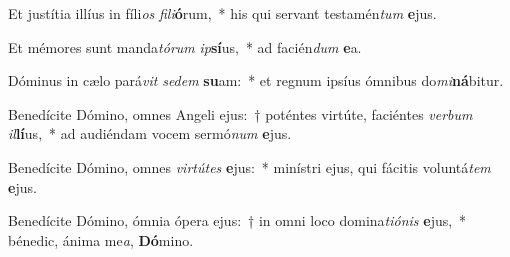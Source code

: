 \item Et justítia illíus in fíli\textit{os} \textit{fi}\textit{li}\textbf{ó}rum,~* his qui servant testamén\textit{tum} \textbf{e}jus.
\item Et mémores sunt manda\textit{tó}\textit{rum} \textit{ip}\textbf{sí}us,~* ad facién\textit{dum} \textbf{e}a.
\item Dóminus in cælo pará\textit{vit} \textit{se}\textit{dem} \textbf{su}am:~* et regnum ipsíus ómnibus do\textit{mi}\textbf{ná}bitur.
\item Benedícite Dómino, omnes Angeli ejus:~† poténtes virtúte, faciéntes \textit{ver}\textit{bum} \textit{il}\textbf{lí}us,~* ad audiéndam vocem sermó\textit{num} \textbf{e}jus.
\item Benedícite Dómino, omnes \textit{vir}\textit{tú}\textit{tes} \textbf{e}jus:~* minístri ejus, qui fácitis voluntá\textit{tem} \textbf{e}jus.
\item Benedícite Dómino, ómnia ópera ejus:~† in omni loco domina\textit{ti}\textit{ó}\textit{nis} \textbf{e}jus,~* bénedic, ánima me\textit{a}, \textbf{Dó}mino.
